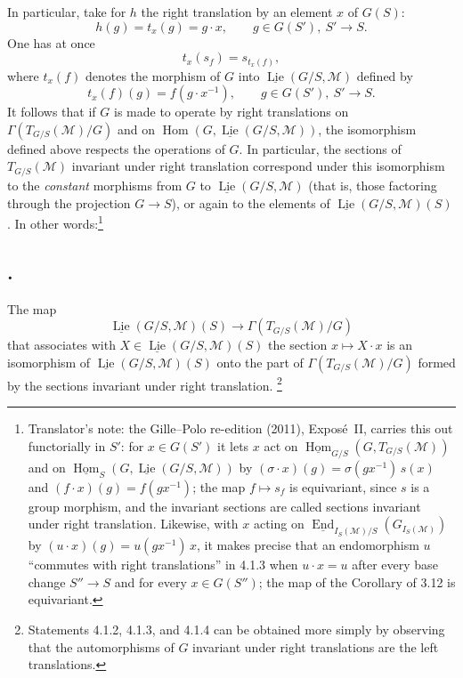 In particular, take for \(h\) the right translation by an element \(x\) of
\(G(S)\):
\[
  h(g)=t_x(g)=g\cdot x,\qquad g\in G(S'),\ S'\to S.
\]
One has at once
\[
  t_x(s_f)=s_{t_x(f)},
\]
where \(t_x(f)\) denotes the morphism of \(G\) into
\(\underline{\operatorname{Lie}}(G/S,\mathcal M)\) defined by
\[
  t_x(f)(g)=f(g\cdot x^{-1}),\qquad g\in G(S'),\ S'\to S.
\]
It follows that if \(G\) is made to operate by right translations on
\(\Gamma(T_{G/S}(\mathcal M)/G)\) and on
\(\operatorname{Hom}(G,\underline{\operatorname{Lie}}(G/S,\mathcal M))\),
the isomorphism defined above respects the operations of \(G\). In
particular, the sections of \(T_{G/S}(\mathcal M)\) invariant under right
translation correspond under this isomorphism to the \emph{constant}
morphisms from \(G\) to \(\underline{\operatorname{Lie}}(G/S,\mathcal M)\)
(that is, those factoring through the projection \(G\to S\)), or again to
the elements of \(\underline{\operatorname{Lie}}(G/S,\mathcal M)(S)\). In
other words:\footnote{Translator's note: the Gille--Polo re-edition (2011),
Expos\'e~II, carries this out functorially in \(S'\): for \(x\in G(S')\)
it lets \(x\) act on
\(\underline{\operatorname{Hom}}_{G/S}(G,T_{G/S}(\mathcal M))\) and on
\(\underline{\operatorname{Hom}}_S(G,\underline{\operatorname{Lie}}(G/S,\mathcal M))\)
by \((\sigma\cdot x)(g)=\sigma(gx^{-1})\,s(x)\) and
\((f\cdot x)(g)=f(gx^{-1})\); the map \(f\mapsto s_f\) is equivariant,
since \(s\) is a group morphism, and the invariant sections are called
sections invariant under right translation. Likewise, with \(x\) acting on
\(\underline{\operatorname{End}}_{I_S(\mathcal M)/S}(G_{I_S(\mathcal M)})\)
by \((u\cdot x)(g)=u(gx^{-1})\,x\), it makes precise that an endomorphism
\(u\) ``commutes with right translations'' in 4.1.3 when \(u\cdot x=u\)
after every base change \(S''\to S\) and for every \(x\in G(S'')\); the map
of the Corollary of 3.12 is equivariant.}

\subsection*{.}
The map
\[
 \underline{\operatorname{Lie}}(G/S,\mathcal M)(S)
 \longrightarrow \Gamma(T_{G/S}(\mathcal M)/G)
\]
that associates with \(X\in\underline{\operatorname{Lie}}(G/S,\mathcal M)(S)\)
the section \(x\mapsto X\cdot x\) is an isomorphism of
\(\underline{\operatorname{Lie}}(G/S,\mathcal M)(S)\) onto the part of
\(\Gamma(T_{G/S}(\mathcal M)/G)\) formed by the sections invariant under
right translation.
\footnote{Statements 4.1.2, 4.1.3, and 4.1.4 can be obtained more simply
by observing that the automorphisms of \(G\) invariant under right
translations are the left translations.}

